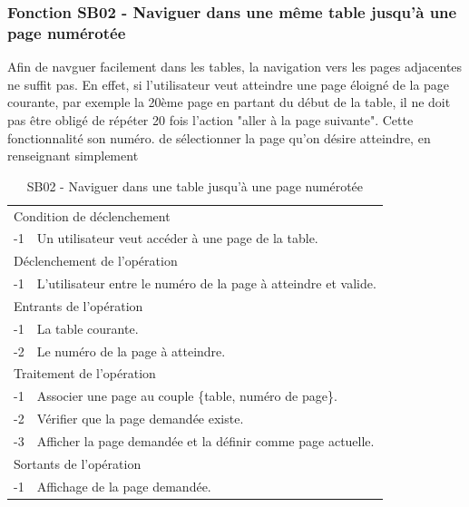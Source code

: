 \documentclass[a4paper]{article}
\begin{document}
\subsubsection{Fonction SB02 - Naviguer dans une m\^eme table jusqu'à une page numérotée}

Afin de navguer facilement dans les tables, la navigation vers les pages adjacentes ne suffit pas. En effet, si l'utilisateur veut atteindre une page éloigné de la page courante, par exemple la 20ème page en partant du début de la table, il  ne doit pas être obligé de répéter 20 fois l'action "aller à la page suivante". Cette fonctionnalité son numéro.  de sélectionner la page qu'on désire atteindre, en renseignant simplement
\begin{table}[H]
  \centering
   \small
	\begin{tabular}{|c|p{12cm}|}
   		\hline
   			\rowcolor{lightgray}\multicolumn{2}{|c|}{\textbf{SB02 - Naviguer dans une m\^eme table jusqu'à une page numérotée}} \\
   		\hline
   			\multicolumn{2}{|l|}{Condition de d\'eclenchement} \\
   		\hline
   		-1 & Un utilisateur veut acc\'eder \`a une page de la table. \\
   		\hline
   			\multicolumn{2}{|l|}{D\'eclenchement de l'op\'eration} \\
   		\hline
   			-1 & L'utilisateur entre le numéro de la page à atteindre et valide. \\
   		\hline
   			\multicolumn{2}{|l|}{Entrants de l'op\'eration} \\
   		\hline
   			-1 & La table courante. \\
        	-2 & Le numéro de la page à atteindre. \\ 
   		\hline
   			\multicolumn{2}{|l|}{Traitement de l'op\'eration} \\
  		\hline
   			-1 & Associer une page au couple \{table, numéro de page\}.  \\
        	-2 & V\'erifier que la page demand\'ee existe. \\
        	-3 & Afficher la page demand\'ee et la d\'efinir comme page actuelle. \\
   		\hline
   			\multicolumn{2}{|l|}{Sortants de l'op\'eration} \\
   		\hline
   			-1 & Affichage de la page demand\'ee. \\
   		\hline
	\end{tabular}
  \caption{SB02 - Naviguer dans une table jusqu'à une page numérotée}
  \normalsize
  \label{tab:naviguer_table_unique}
\end{table}
\end{document}
